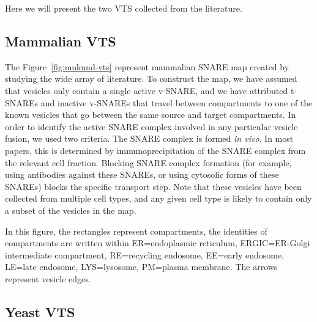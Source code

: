 Here we will present the two VTS collected from the literature.

\subsection{Mammalian VTS}


The Figure~\ref{fig:mukund-vts} represent mammalian SNARE map
created by studying the wide array of literature.
% 
To construct the map, we have assumed that vesicles only contain a
single active v-SNARE, and we have attributed t-SNAREs and inactive
v-SNAREs that travel between compartments to one of the known vesicles
that go between the same source and target compartments.
%
In order to identify the active SNARE complex involved in any
particular vesicle fusion, we used two criteria.
%
The SNARE complex is formed \textit{in vivo}. In most papers, this is
determined by immunoprecipitation of the SNARE complex from the
relevant cell fraction.
%
Blocking SNARE complex formation (for example, using antibodies
against these SNAREs, or using cytosolic forms of these SNAREs) blocks
the specific transport step.
%
Note that these vesicles have been collected from multiple cell types, and
any given cell type is likely to contain only a subset of the vesicles in
the map.

In this figure, the rectangles represent compartments, the identities
of compartments are written within ER=endoplasmic reticulum,
ERGIC=ER-Golgi intermediate compartment, RE=recycling endosome,
EE=early endosome, LE=late endosome, LYS=lysosome, PM=plasma
membrane. The arrows represent vesicle edges.




\subsection{Yeast VTS}

